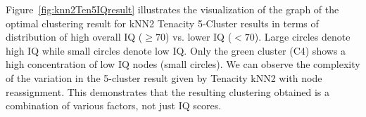\documentclass{bmcart}
\begin{document}
Figure~\ref{fig:knn2Ten5IQresult} illustrates the visualization of the graph of the optimal clustering result for kNN2 Tenacity 5-Cluster results in terms of distribution of high overall IQ ($\geq 70$) vs. lower IQ ($<70$). Large circles denote high IQ while small circles denote low IQ. Only the green cluster (C4) shows a high concentration of low IQ nodes (small circles).  We can observe the complexity of the variation in the 5-cluster result given by Tenacity kNN2 with node reassignment. This demonstrates that the resulting clustering obtained is a combination of various factors, not just IQ scores. 



\end{document}
